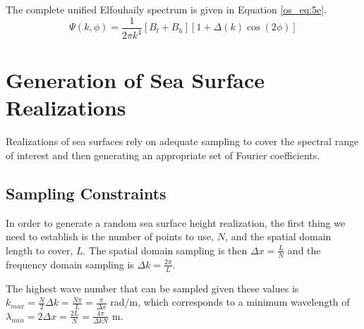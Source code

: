 The complete unified Elfouhaily spectrum is given in Equation \ref{os_eq:5e}.
\begin{equation}
\label{os_eq:5e}
\boxed{\Psi(k,\phi) = \frac{1}{2\pi k^4}\left[B_l + B_h \right] \left[1 + \Delta(k)\cos(2\phi) \right]}
\end{equation}

\section{Generation of Sea Surface Realizations}
Realizations of sea surfaces rely on adequate sampling to cover the spectral range of interest and then generating an appropriate set of Fourier coefficients.

\subsection{Sampling Constraints}
In order to generate a random sea surface height realization,  the first thing we need to establish is the number of points to use, $N$, and the spatial domain length to cover, $L$. The spatial domain sampling is then $\Delta x = \frac{L}{N}$ and the frequency domain sampling is $\Delta k = \frac{2\pi}{L}$.

The highest wave number that can be sampled given these values is $k_{max} = \frac{N}{2}\Delta k = \frac{N\pi}{L} = \frac{\pi}{\Delta x}$ rad/m, which corresponds to a minimum wavelength of $\lambda_{min} = 2\Delta x = \frac{2L}{N} = \frac{4\pi}{\Delta k N}$ m.

